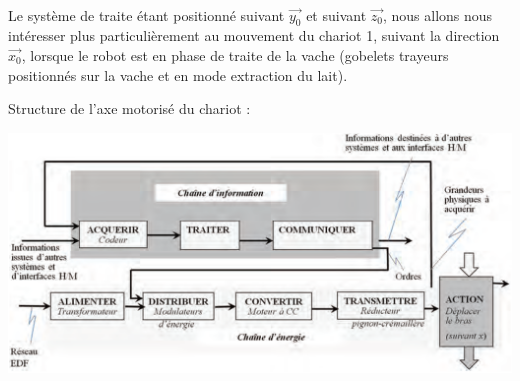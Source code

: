 ~\

Le système de traite étant positionné suivant $\overrightarrow{y_0}$ et suivant $\overrightarrow{z_0}$, nous allons nous intéresser plus particulièrement au mouvement du chariot 1, suivant la direction $\overrightarrow{x_0}$, lorsque le robot est en phase de traite de la vache (gobelets trayeurs positionnés sur la vache et en mode extraction du lait).

\newpage

Structure de l'axe motorisé du chariot :

\begin{center}
 \includegraphics[width=0.8\linewidth]{img/img118}
\end{center}

